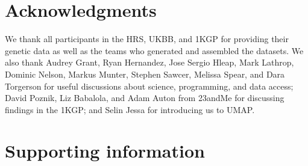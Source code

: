 \section{Acknowledgments}
We thank all participants in the HRS, UKBB, and 1KGP for providing their genetic data as well as the teams who generated and assembled the datasets. We also thank Audrey Grant, Ryan Hernandez, Jose Sergio Hleap, Mark Lathrop, Dominic Nelson, Markus Munter, Stephen Sawcer, Melissa Spear, and Dara Torgerson for useful discussions about science, programming, and data access; David Poznik, Liz Babalola, and Adam Auton from 23andMe for discussing findings in the 1KGP; and Selin Jessa for introducing us to UMAP.


\clearpage

\section{Supporting information}

\makeatletter
\renewcommand\thetable{\@arabic\c@chapter s\@arabic\c@table}
\renewcommand \thefigure{\@arabic\c@chapter s\@arabic\c@figure}
\makeatother

\setcounter{figure}{0}  
\setcounter{table}{0}



\clearpage